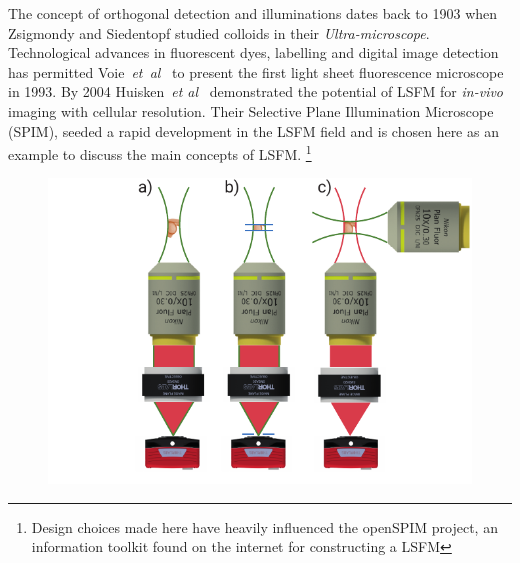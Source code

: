 The concept of orthogonal detection and illuminations dates back to 1903 when Zsigmondy and Siedentopf studied colloids in their \textit{Ultra-microscope}.
Technological advances in fluorescent dyes, labelling and digital image detection has permitted Voie~\emph{et~al}~\cite{voie_orthogonal-plane_1993}
to present the first light sheet fluorescence microscope in 1993.
By 2004 Huisken~\emph{et al}~\cite{huisken_optical_2004-1}
demonstrated the potential of LSFM for \emph{in-vivo} imaging with cellular resolution.
Their Selective Plane Illumination Microscope (SPIM), seeded a rapid development in the LSFM field and is chosen here as an example to discuss the main concepts of LSFM.\@
\footnote{Design choices made here have heavily influenced the openSPIM project, an information toolkit found on the internet for constructing a LSFM}


\begin{figure}
    \centering
    \includegraphics{./epi_con_lsfm}
    \caption{}
    \label{fig:epi_con_lsfm}
\end{figure}


